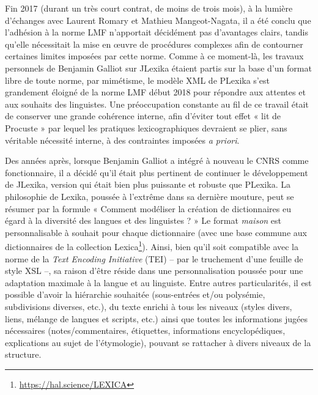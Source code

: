 Fin 2017 (durant un très court contrat, de moins de trois mois), à la lumière d'échanges avec Laurent Romary et Mathieu Mangeot-Nagata, il a été conclu que l'adhésion à la norme LMF n'apportait décidément pas d'avantages clairs, tandis qu'elle nécessitait la mise en œuvre de procédures complexes afin de contourner certaines limites imposées par cette norme. Comme à ce moment-là, les travaux personnels de Benjamin Galliot sur JLexika étaient partis sur la base d’un format libre de toute norme, par mimétisme, le modèle XML de PLexika s’est grandement éloigné de la norme LMF début 2018 pour répondre aux attentes et aux souhaits
des linguistes. Une préoccupation constante au fil de ce travail était de conserver une grande cohérence interne, afin d'éviter tout effet « lit de Procuste » par lequel les pratiques lexicographiques devraient se plier, sans véritable nécessité interne, à des contraintes imposées \emph{a priori}.

Des années après, lorsque Benjamin Galliot a intégré à nouveau le CNRS comme fonctionnaire, il a décidé qu’il était plus pertinent de continuer le développement de JLexika, version qui était bien plus puissante et robuste que PLexika. La philosophie de Lexika, poussée à l’extrême dans sa dernière mouture, peut se résumer par la formule « Comment modéliser la création de dictionnaires eu égard à la diversité des langues et des linguistes ? » Le format \emph{maison} est personnalisable à souhait pour chaque dictionnaire (avec une base commune aux dictionnaires de la collection Lexica\footnote{\url{https://hal.science/LEXICA}}). Ainsi, bien qu’il soit compatible avec la norme de la \emph{Text Encoding Initiative} (TEI) – par le truchement d’une feuille de style XSL –, sa raison d’être réside dans une personnalisation poussée pour une adaptation maximale à la langue et au linguiste. Entre autres particularités, il est possible d’avoir la hiérarchie souhaitée (sous-entrées et/ou polysémie, subdivisions diverses, etc.), du texte enrichi à tous les niveaux (styles divers, liens, mélange de langues et scripts, etc.) ainsi que toutes les informations jugées nécessaires (notes/commentaires, étiquettes, informations encyclopédiques, explications au sujet de l'étymologie), pouvant se rattacher à divers niveaux de la structure.


